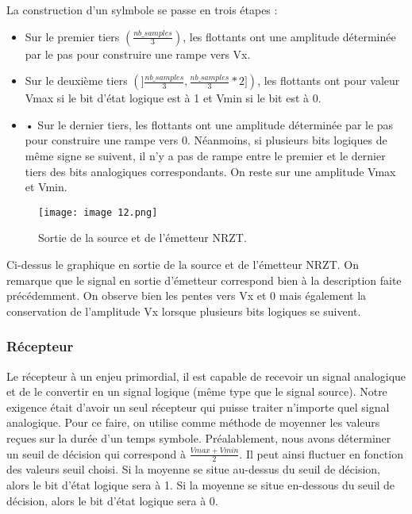 La construction d'un sylmbole se passe en trois étapes :
\begin{itemize}
    \item Sur le premier tiers $ \left(\frac{nb\_samples}{3} \right) $, les flottants ont une amplitude déterminée par le pas pour construire une rampe vers Vx.
    \item Sur le deuxième tiers $(]\frac{nb\_samples}{3}, \frac{nb\_samples}{3}*2]) $, les flottants ont pour valeur Vmax si le bit d'état logique est à 1 et Vmin si le bit est à 0.
    \item •	Sur le dernier tiers, les flottants ont une amplitude déterminée par le pas pour construire une rampe vers 0. Néanmoins, si plusieurs bits logiques de même signe se suivent, il n’y a pas de rampe entre le premier et le dernier tiers des bits analogiques correspondants. On reste sur une amplitude Vmax et Vmin.
\end{itemize}

\begin{figure}[h]
    \centering
    \texttt{[image: image 12.png]}
    \caption{\label{fig:image12}Sortie de la source et de l'émetteur NRZT.}
\end{figure}

Ci-dessus le graphique en sortie de la source et de l’émetteur NRZT. On remarque que le signal en sortie d’émetteur correspond bien à la description faite précédemment. On observe bien les pentes vers Vx et 0 mais également la conservation de l’amplitude Vx lorsque plusieurs bits logiques se suivent.

\subsubsection{Récepteur}

Le récepteur à un enjeu primordial, il est capable de recevoir un signal analogique et de le convertir en un signal logique (même type que le signal source). Notre exigence était d’avoir un seul récepteur qui puisse traiter n’importe quel signal analogique.
Pour ce faire, on utilise comme méthode de moyenner les valeurs reçues sur la durée d’un temps symbole. Préalablement, nous avons déterminer un seuil de décision qui correspond à $\frac{Vmax + Vmin}{2}$.
Il peut ainsi fluctuer en fonction des valeurs seuil choisi. Si la moyenne se situe au-dessus du seuil de décision, alors le bit d’état logique sera à 1. Si la moyenne se situe en-dessous du seuil de décision, alors le bit d’état logique sera à 0.

